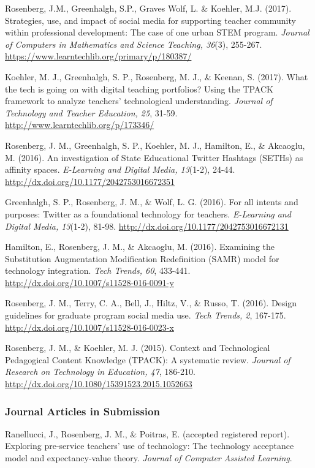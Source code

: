 \documentclass[]{article}
\begin{document}
Rosenberg, J.M., Greenhalgh, S.P., Graves Wolf, L. \& Koehler, M.J.
(2017). Strategies, use, and impact of social media for supporting
teacher community within professional development: The case of one urban
STEM program. \emph{Journal of Computers in Mathematics and Science
Teaching, 36}(3), 255-267.
\url{https://www.learntechlib.org/primary/p/180387/}

Koehler, M. J., Greenhalgh, S. P., Rosenberg, M. J., \& Keenan, S.
(2017). What the tech is going on with digital teaching portfolios?
Using the TPACK framework to analyze teachers' technological
understanding. \emph{Journal of Technology and Teacher Education, 25},
31-59. \url{http://www.learntechlib.org/p/173346/}

Rosenberg, J. M., Greenhalgh, S. P., Koehler, M. J., Hamilton, E., \&
Akcaoglu, M. (2016). An investigation of State Educational Twitter
Hashtags (SETHs) as affinity spaces. \emph{E-Learning and Digital Media,
13}(1-2), 24-44. \url{http://dx.doi.org/10.1177/2042753016672351}

Greenhalgh, S. P., Rosenberg, J. M., \& Wolf, L. G. (2016). For all
intents and purposes: Twitter as a foundational technology for teachers.
\emph{E-Learning and Digital Media, 13}(1-2), 81-98.
\url{http://dx.doi.org/10.1177/2042753016672131}

Hamilton, E., Rosenberg, J. M., \& Akcaoglu, M. (2016). Examining the
Substitution Augmentation Modification Redefinition (SAMR) model for
technology integration. \emph{Tech Trends, 60}, 433-441.
\url{http://dx.doi.org/10.1007/s11528-016-0091-y}

Rosenberg, J. M., Terry, C. A., Bell, J., Hiltz, V., \& Russo, T.
(2016). Design guidelines for graduate program social media use.
\emph{Tech Trends, 2}, 167-175.
\url{http://dx.doi.org/10.1007/s11528-016-0023-x}

Rosenberg, J. M., \& Koehler, M. J. (2015). Context and Technological
Pedagogical Content Knowledge (TPACK): A systematic review.
\emph{Journal of Research on Technology in Education, 47}, 186-210.
\url{http://dx.doi.org/10.1080/15391523.2015.1052663}

\subsubsection{Journal Articles in
Submission}\label{journal-articles-in-submission}

Ranellucci, J., Rosenberg, J. M., \& Poitras, E. (accepted registered
report). Exploring pre-service teachers' use of technology: The
technology acceptance model and expectancy-value theory. \emph{Journal
of Computer Assisted Learning}.
\end{document}
